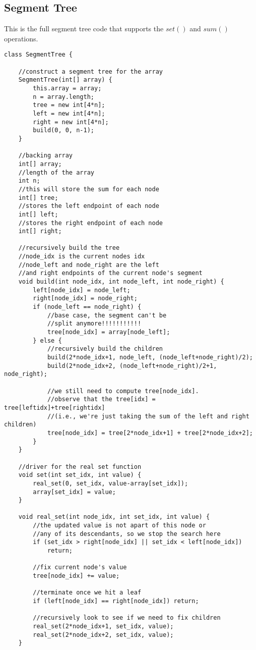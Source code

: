 \documentclass[11pt]{article}
\theoremstyle{plain}
\theoremstyle{definition}
\begin{document}
\subsection*{Segment Tree}
This is the full segment tree code that supports the $set()$ and $sum()$ operations.
\begin{lstlisting}
class SegmentTree {
	
	//construct a segment tree for the array
	SegmentTree(int[] array) {
		this.array = array;
		n = array.length;
		tree = new int[4*n];
		left = new int[4*n];
		right = new int[4*n];
		build(0, 0, n-1);
	}

	//backing array
	int[] array;
	//length of the array
	int n;
	//this will store the sum for each node
	int[] tree;
	//stores the left endpoint of each node
	int[] left;
	//stores the right endpoint of each node
	int[] right;

	//recursively build the tree
	//node_idx is the current nodes idx
	//node_left and node_right are the left
	//and right endpoints of the current node's segment
	void build(int node_idx, int node_left, int node_right) {
		left[node_idx] = node_left;
		right[node_idx] = node_right;
		if (node_left == node_right) {
			//base case, the segment can't be
			//split anymore!!!!!!!!!!!
			tree[node_idx] = array[node_left];
		} else {
			//recursively build the children
			build(2*node_idx+1, node_left, (node_left+node_right)/2);
			build(2*node_idx+2, (node_left+node_right)/2+1, node_right);

			//we still need to compute tree[node_idx].
			//observe that the tree[idx] = tree[leftidx]+tree[rightidx]
			//(i.e., we're just taking the sum of the left and right children)
			tree[node_idx] = tree[2*node_idx+1] + tree[2*node_idx+2];
		}
	}

	//driver for the real set function
	void set(int set_idx, int value) {
		real_set(0, set_idx, value-array[set_idx]);
		array[set_idx] = value;
	}

	void real_set(int node_idx, int set_idx, int value) {
		//the updated value is not apart of this node or
		//any of its descendants, so we stop the search here
		if (set_idx > right[node_idx] || set_idx < left[node_idx])
			return;

		//fix current node's value
		tree[node_idx] += value;

		//terminate once we hit a leaf
		if (left[node_idx] == right[node_idx]) return;

		//recursively look to see if we need to fix children
		real_set(2*node_idx+1, set_idx, value);
		real_set(2*node_idx+2, set_idx, value);
	}


\end{lstlisting}
\end{document}
